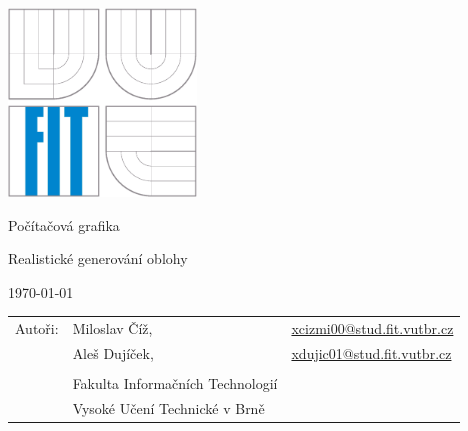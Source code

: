 \documentclass[12pt,a4paper,titlepage,final]{report}
\makeatletter
\newcommand\Course{Počítačová grafika}
\newcommand\WorkTitle{Realistické generování oblohy}
\newcommand\AuthorA{Miloslav Číž}
\newcommand\AuthorAEmail{xcizmi00@stud.fit.vutbr.cz}
\newcommand\AuthorB{Aleš Dujíček}
\newcommand\AuthorBEmail{xdujic01@stud.fit.vutbr.cz}
\newcommand\Faculty{Fakulta Informačních Technologií}
\newcommand\School{Vysoké Učení Technické v Brně}
\makeatother
\begin{document}
    \begin{titlepage}
    \begin{center}
        \includegraphics[height=5cm]{images/logo.eps}
    \end{center}
    \vfill
    \begin{center}
        \begin{Large}
            \Course\\
        \end{Large}
        \bigskip
        \begin{Huge}
            \WorkTitle\\
        \end{Huge}
    \end{center}
    \vfill
    \begin{center}
        \begin{large}
            \today
        \end{large}
    \end{center}
    \vfill
    \begin{flushleft}
        \begin{large}
            \begin{tabular}{lll}
                Autoři: & \AuthorA, & \url{\AuthorAEmail} \\
                        & \AuthorB, & \url{\AuthorBEmail} \\
                & & \\
                & \Faculty \\
                & \School \\
            \end{tabular}
        \end{large}
    \end{flushleft}
\end{titlepage}


\tableofcontents

\newpage
\end{document}
